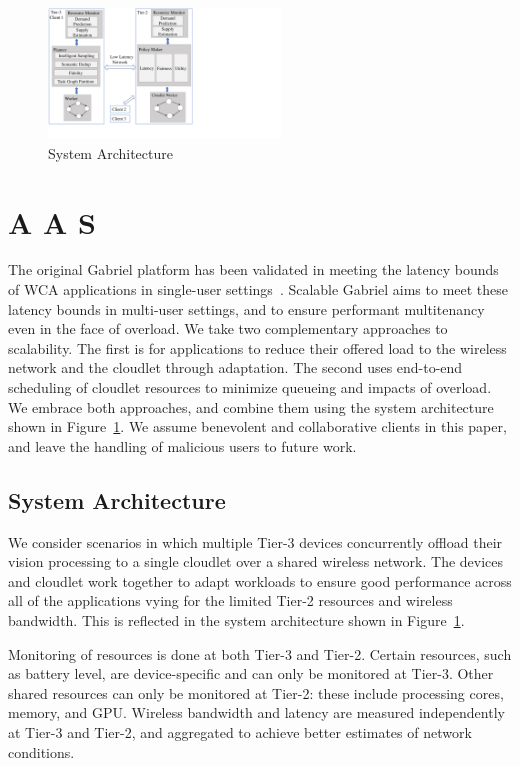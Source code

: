\begin{figure}
\centering
\includegraphics[width=0.55\textwidth,trim=0 3em 11cm 0, clip]{FIGS/arch-vertical.pdf}
\caption{\small System Architecture}
\label{fig:arch}
\vspace{-0.2in}
\end{figure}


\section{A   A S}
\label{sec:arch}
 

The original Gabriel platform has been validated in meeting the
latency bounds of WCA applications in single-user
settings~\cite{Chen2017}.  Scalable Gabriel aims to meet these latency
bounds in multi-user settings, and to ensure performant multitenancy
even in the face of overload.  We take two complementary approaches to
scalability.  The first is for applications to reduce their offered
load to the wireless network and the cloudlet through adaptation.  The
second uses end-to-end scheduling of cloudlet resources to minimize
queueing and impacts of overload.  We embrace both approaches, and
combine them using the system architecture shown in
Figure~\ref{fig:arch}.  We assume benevolent and collaborative clients
in this paper, and leave the handling of malicious users to future work.

\subsection{System Architecture}

We consider scenarios in which multiple Tier-3 devices concurrently
offload their vision processing to a single cloudlet over a shared
wireless network.  The devices and cloudlet work together to adapt
workloads to ensure good performance across all of the applications
vying for the limited Tier-2 resources and wireless bandwidth.  This
is reflected in the system architecture shown in
Figure~\ref{fig:arch}.

Monitoring of resources is done at both Tier-3 and Tier-2.  Certain
resources, such as battery level, are device-specific and can only be
monitored at Tier-3.  Other shared resources can only be monitored at
Tier-2: these include processing cores, memory, and GPU.  Wireless
bandwidth and latency are measured independently at Tier-3 and Tier-2,
and aggregated to achieve better estimates of network conditions.

